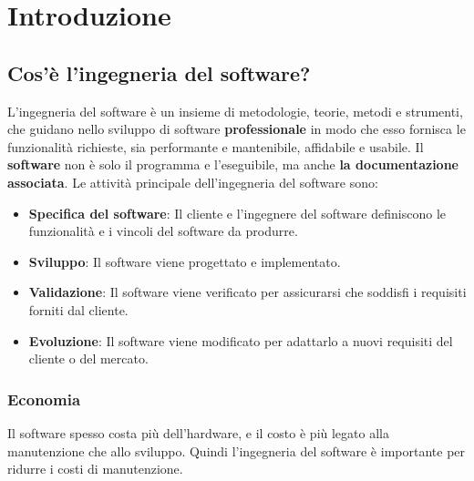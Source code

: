 \documentclass[a4paper]{article}
\begin{document}


\tableofcontents
\pagebreak

\section{Introduzione}
\subsection{Cos'è l'ingegneria del software?}
L'ingegneria del software è un insieme di metodologie, teorie, metodi e strumenti, che
guidano nello sviluppo di software \textbf{professionale} in modo che esso fornisca
le funzionalità richieste, sia performante e mantenibile, affidabile e usabile. Il
\textbf{software} non è solo il programma e l'eseguibile, ma anche \textbf{la 
documentazione associata}. Le attività principale dell'ingegneria del software sono:
\begin{itemize}
  \item \textbf{Specifica del software}: Il cliente e l'ingegnere del software definiscono
  le funzionalità e i vincoli del software da produrre.
  \item \textbf{Sviluppo}: Il software viene progettato e implementato.
  \item \textbf{Validazione}: Il software viene verificato per
    assicurarsi che soddisfi i requisiti forniti dal cliente.
  \item \textbf{Evoluzione}: Il software viene modificato per adattarlo a nuovi
    requisiti del cliente o del mercato. 
\end{itemize}

\subsubsection{Economia}
Il software spesso costa più dell'hardware, e il costo è più legato alla manutenzione che
allo sviluppo. Quindi l'ingegneria del software è importante per ridurre i costi di
manutenzione.
\end{document}
